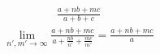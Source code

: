 \begin{gather*}
    \frac{a + nb + mc}{a + b + c}
\end{gather*}
\begin{gather*}
    \lim_{n', m' \to \infty} \frac{a + nb + mc}{a + \frac{nb}{n'} + \frac{mc}{m'}} = \frac{a + nb + mc}{a}
\end{gather*}
    




